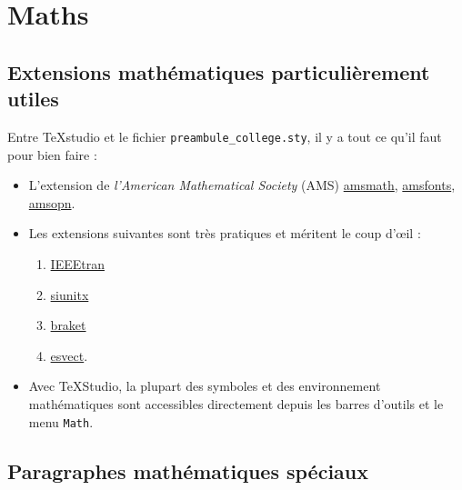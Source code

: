 \chapter{Maths}





\section{Extensions mathématiques particulièrement utiles}

Entre TeXstudio et le fichier \texttt{preambule_college.sty}, il y a tout ce qu'il faut pour bien faire :
\begin{itemize}
	\item L'extension de \emph{l'American Mathematical Society} (AMS) \href{https://www.ctan.org/pkg/amsmath}{amsmath}, \href{https://www.ctan.org/tex-archive/fonts/amsfonts}{amsfonts}, \href{https://www.ctan.org/pkg/amsopn}{amsopn}.
	\item Les extensions suivantes sont très pratiques et méritent le coup d'{\oe}il :
		\begin{enumerate}
			\item  \href{https://www.ctan.org/tex-archive/macros/latex/contrib/IEEEtran/}{IEEEtran}
			\item \href{https://www.ctan.org/pkg/siunitx}{siunitx}
			\item \href{https://www.ctan.org/tex-archive/macros/latex/contrib/braket}{braket}
			\item \href{https://www.ctan.org/pkg/esvect}{esvect}.
		\end{enumerate}
	\item Avec TeXStudio, la plupart des symboles et des environnement mathématiques sont accessibles directement depuis les barres d'outils et le menu \texttt{Math}.
\end{itemize}





\section{Paragraphes mathématiques spéciaux}

